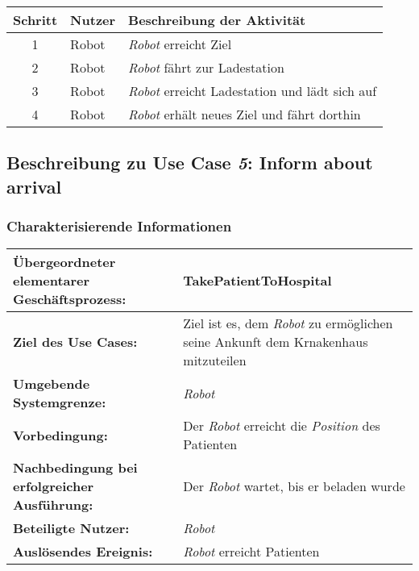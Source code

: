 			\begin{table}[H]
				\centering
				\begin{tabularx}{\textwidth}{@{}cp{2cm}X@{}}
				\hline
				Schritt & Nutzer & Beschreibung der Aktivität \\ \hline
				1 & Robot & \emph{Robot} erreicht Ziel \\
				2 & Robot & \emph{Robot} fährt zur Ladestation \\
				3 & Robot & \emph{Robot} erreicht Ladestation und lädt sich auf \\
				4 & Robot & \emph{Robot} erhält neues Ziel und fährt dorthin \\
				\hline
				\end{tabularx}
			\end{table}

			
		\pagebreak
		
			\subsection{Beschreibung zu Use Case \emph{5}: Inform about arrival}

			\subsubsection*{Charakterisierende Informationen}

			\begin{table}[H]
				\centering
				\begin{tabularx}{\textwidth}{@{}p{5cm}X@{}}
				\hline
				\textbf{Übergeordneter elementarer Geschäftsprozess:} & TakePatientToHospital\\ \hline
				\textbf{Ziel des Use Cases:} & Ziel ist es, dem \emph{Robot} zu ermöglichen seine Ankunft dem Krnakenhaus mitzuteilen\\ \hline
				\textbf{Umgebende Systemgrenze:} & \emph{Robot}\\ \hline
				\textbf{Vorbedingung:} & Der \emph{Robot} erreicht die \emph{Position} des Patienten\\ \hline
				\textbf{Nachbedingung bei erfolgreicher Ausführung:} & Der \emph{Robot} wartet, bis er beladen wurde\\ \hline
				\textbf{Beteiligte Nutzer:} & \emph{Robot}\\ \hline
				\textbf{Auslösendes Ereignis:} & \emph{Robot} erreicht Patienten\\
				\hline
				\end{tabularx}
			\end{table}

